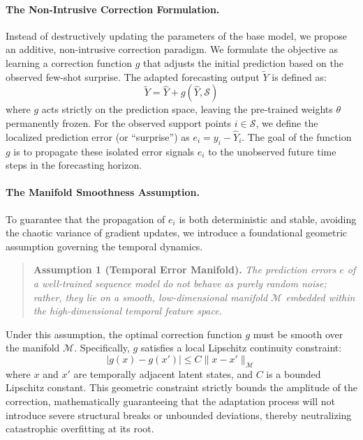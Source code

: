 \documentclass{article}
\begin{document}
	\paragraph{The Non-Intrusive Correction Formulation.} Instead of destructively updating the parameters of the base model, we propose an additive, non-intrusive correction paradigm. We formulate the objective as learning a correction function $g$ that adjusts the initial prediction based on the observed few-shot surprise. The adapted forecasting output $\tilde{Y}$ is defined as:
	\begin{equation}
		\tilde{Y} = \hat{Y} + g(\hat{Y}, \mathcal{S})
	\end{equation}
	where $g$ acts strictly on the prediction space, leaving the pre-trained weights $\theta$ permanently frozen. For the observed support points $i \in \mathcal{S}$, we define the localized prediction error (or ``surprise'') as $e_i = y_i - \hat{Y}_i$. The goal of the function $g$ is to propagate these isolated error signals $e_i$ to the unobserved future time steps in the forecasting horizon.
	
	\paragraph{The Manifold Smoothness Assumption.} To guarantee that the propagation of $e_i$ is both deterministic and stable, avoiding the chaotic variance of gradient updates, we introduce a foundational geometric assumption governing the temporal dynamics.
	
	\begin{quote}
		\textbf{Assumption 1 (Temporal Error Manifold).} \textit{The prediction errors $e$ of a well-trained sequence model do not behave as purely random noise; rather, they lie on a smooth, low-dimensional manifold $\mathcal{M}$ embedded within the high-dimensional temporal feature space.}
	\end{quote}
	
	Under this assumption, the optimal correction function $g$ must be smooth over the manifold $\mathcal{M}$. Specifically, $g$ satisfies a local Lipschitz continuity constraint:
	\begin{equation}
		|g(x) - g(x')| \leq C \|x - x'\|_{\mathcal{M}}
	\end{equation}
	where $x$ and $x'$ are temporally adjacent latent states, and $C$ is a bounded Lipschitz constant. This geometric constraint strictly bounds the amplitude of the correction, mathematically guaranteeing that the adaptation process will not introduce severe structural breaks or unbounded deviations, thereby neutralizing catastrophic overfitting at its root.	
	
\end{document}
